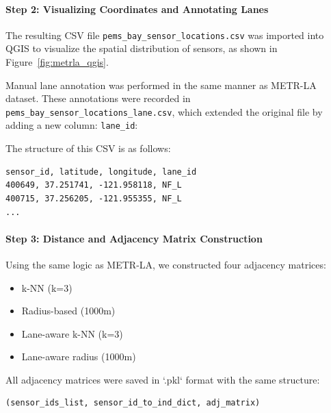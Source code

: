 \documentclass[runningheads]{llncs}
\begin{document}
\paragraph{Step 2: Visualizing Coordinates and Annotating Lanes}
The resulting CSV file \texttt{pems\_bay\_sensor\_locations.csv} was imported into QGIS to visualize the spatial distribution of sensors, as shown in Figure~\ref{fig:metrla_qgis}.


Manual lane annotation was performed in the same manner as METR-LA dataset. These annotations were recorded in \\ \texttt{pems\_bay\_sensor\_locations\_lane.csv}, which extended the original file by adding a new column: \texttt{lane\_id}:

\noindent The structure of this CSV is as follows:
\begin{verbatim}
sensor_id, latitude, longitude, lane_id
400649, 37.251741, -121.958118, NF_L
400715, 37.256205, -121.955355, NF_L
...
\end{verbatim}

\paragraph{Step 3: Distance and Adjacency Matrix Construction}
Using the same logic as METR-LA, we constructed four adjacency matrices:

\begin{itemize}
    \item k-NN (k=3)
    \item Radius-based (1000m)
    \item Lane-aware k-NN (k=3)
    \item Lane-aware radius (1000m) 
\end{itemize}

\noindent All adjacency matrices were saved in `.pkl` format with the same structure:
\begin{verbatim}
(sensor_ids_list, sensor_id_to_ind_dict, adj_matrix)
\end{verbatim}
\end{document}
